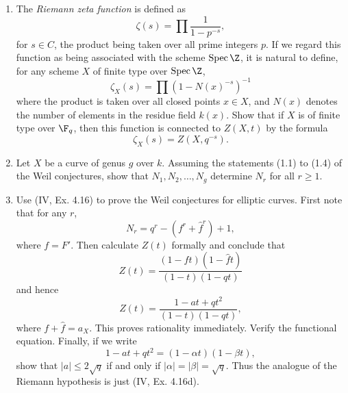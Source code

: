 \documentclass[a4paper]{article}
\begin{document}
\begin{enumerate} [label=\textbf{\arabic*.}, leftmargin=0em]
      \item The \textit{Riemann zeta function} is defined as
      \begin{equation*}
            \zeta(s) = \prod \frac{1}{1 - p^{-s}},
      \end{equation*}
      for $s \in C$, the product being taken over all prime integers $p$.
      If we regard this function as being associated with the scheme $\spec{\Z}$, it is natural to define, for any scheme $X$ of finite type over $\spec{\Z}$,
      \begin{equation*}
            \zeta_X(s) = \prod (1 - N(x)^{-s})^{-1}
      \end{equation*}
      where the product is taken over all closed points $x \in X$, and $N(x)$ denotes the number of elements in the residue field $k(x)$.
      Show that if $X$ is of finite type over $\F_q$, then this function is connected to $Z(X, t)$ by the formula
      \begin{equation*}
            \zeta_X(s) = Z(X, q^{-s}).
      \end{equation*}

      \item Let $X$ be a curve of genus $g$ over $k$.
      Assuming the statements (1.1) to (1.4) of the Weil conjectures, show that $N_1, N_2, \dots, N_g$ determine $N_r$ for all $r \geq 1$.

      \item Use (IV, Ex. 4.16) to prove the Weil conjectures for elliptic curves.
      First note that for any $r$,
      \begin{equation*}
            N_r = q^r - (f^r + \hat{f}^r) + 1,
      \end{equation*}
      where $f = F'$.
      Then calculate $Z(t)$ formally and conclude that
      \begin{equation*}
            Z(t) = \frac{(1 - ft)(1 - \hat{f}t)}{(1 - t)(1 - qt)}
      \end{equation*}
      and hence
      \begin{equation*}
            Z(t) = \frac{1 - at + qt^2}{(1 - t)(1 - qt)},
      \end{equation*}
      where $f + \hat{f} = a_X$.
      This proves rationality immediately.
      Verify the functional equation.
      Finally, if we write
      \begin{equation*}
            1 - at + qt^2 = (1 - \alpha t)(1 - \beta t),
      \end{equation*}
      show that $|a| \leq 2 \sqrt{q}$ if and only if $|\alpha| = |\beta| = \sqrt{q}$.
      Thus the analogue of the Riemann hypothesis is just (IV, Ex. 4.16d).


\end{enumerate}
\end{document}
